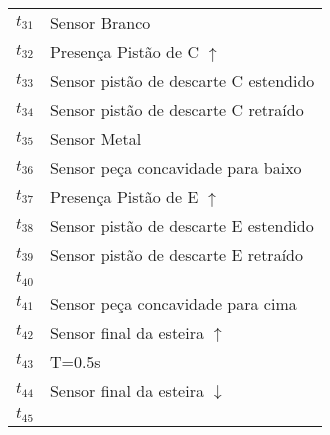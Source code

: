 \begin{table}[htbp]
\begin{tabular}{ll}
\hyperlink{partialNet:t31}{\hypertarget{partialTable:t31}{$t_{31}$}} & Sensor Branco\\
\hyperlink{partialNet:t32}{\hypertarget{partialTable:t32}{$t_{32}$}} & Presença Pistão de C \(\uparrow\)\\
\hyperlink{partialNet:t33}{\hypertarget{partialTable:t33}{$t_{33}$}} & Sensor pistão de descarte C estendido\\
\hyperlink{partialNet:t34}{\hypertarget{partialTable:t34}{$t_{34}$}} & Sensor pistão de descarte C retraído\\
\hyperlink{partialNet:t35}{\hypertarget{partialTable:t35}{$t_{35}$}} & Sensor Metal\\
\hyperlink{partialNet:t36}{\hypertarget{partialTable:t36}{$t_{36}$}} & Sensor peça concavidade para baixo\\
\hyperlink{partialNet:t37}{\hypertarget{partialTable:t37}{$t_{37}$}} & Presença Pistão de E \(\uparrow\)\\
\hyperlink{partialNet:t38}{\hypertarget{partialTable:t38}{$t_{38}$}} & Sensor pistão de descarte E estendido\\
\hyperlink{partialNet:t39}{\hypertarget{partialTable:t39}{$t_{39}$}} & Sensor pistão de descarte E retraído\\
\hyperlink{partialNet:t40}{\hypertarget{partialTable:t40}{$t_{40}$}} & \\
\hyperlink{partialNet:t41}{\hypertarget{partialTable:t41}{$t_{41}$}} & Sensor peça concavidade para cima\\
\hyperlink{partialNet:t42}{\hypertarget{partialTable:t42}{$t_{42}$}} & Sensor final da esteira \(\uparrow\)\\
\hyperlink{partialNet:tt43}{\hypertarget{partialTable:tt43}{$t_{43}$}} & T=0.5s\\
\hyperlink{partialNet:t44}{\hypertarget{partialTable:t44}{$t_{44}$}} & Sensor final da esteira \(\downarrow\)\\
\hyperlink{partialNet:t45}{\hypertarget{partialTable:t45}{$t_{45}$}} & \\
\end{tabular}
\end{table}
